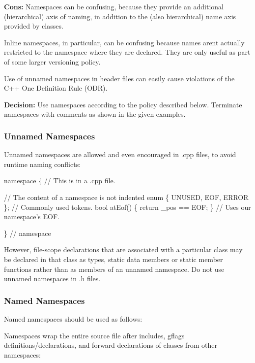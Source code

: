 {\bfseries Cons\+:} Namespaces can be confusing, because they provide an additional (hierarchical) axis of naming, in addition to the (also hierarchical) name axis provided by classes.

Inline namespaces, in particular, can be confusing because names aren\textquotesingle{}t actually restricted to the namespace where they are declared. They are only useful as part of some larger versioning policy.

Use of unnamed namespaces in header files can easily cause violations of the C++ One Definition Rule (O\+DR).

{\bfseries Decision\+:} Use namespaces according to the policy described below. Terminate namespaces with comments as shown in the given examples.

\subsubsection*{Unnamed Namespaces}

Unnamed namespaces are allowed and even encouraged in .cpp files, to avoid runtime naming conflicts\+:


\begin{DoxyCode}
\textcolor{keyword}{namespace }\{                           \textcolor{comment}{// This is in a .cpp file.}

\textcolor{comment}{// The content of a namespace is not indented}
\textcolor{keyword}{enum} \{ UNUSED, EOF, ERROR \};         \textcolor{comment}{// Commonly used tokens.}
\textcolor{keywordtype}{bool} atEof() \{ \textcolor{keywordflow}{return} \_pos == EOF; \}  \textcolor{comment}{// Uses our namespace's EOF.}

\}  \textcolor{comment}{// namespace}
\end{DoxyCode}


However, file-\/scope declarations that are associated with a particular class may be declared in that class as types, static data members or static member functions rather than as members of an unnamed namespace. Do not use unnamed namespaces in .h files.

\subsubsection*{Named Namespaces}

Named namespaces should be used as follows\+:

Namespaces wrap the entire source file after includes, gflags definitions/declarations, and forward declarations of classes from other namespaces\+:


